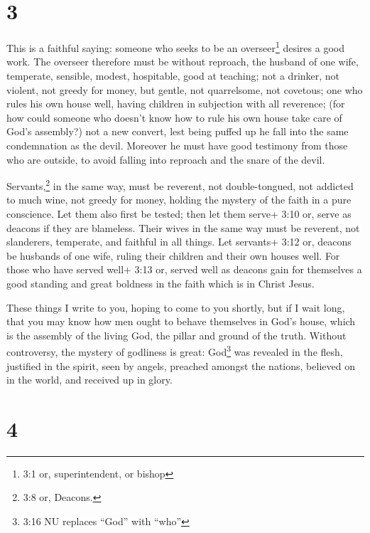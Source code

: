 \hypertarget{section-2}{%
\section{3}\label{section-2}}

 This is a faithful saying: someone who seeks to be an
overseer\footnote{3:1 or, superintendent, or bishop} desires a good
work.  The overseer therefore must be without reproach, the
husband of one wife, temperate, sensible, modest, hospitable, good at
teaching;  not a drinker, not violent, not greedy for money,
but gentle, not quarrelsome, not covetous;  one who rules
his own house well, having children in subjection with all reverence;
 (for how could someone who doesn't know how to rule his own
house take care of God's assembly?)  not a new convert, lest
being puffed up he fall into the same condemnation as the devil.
 Moreover he must have good testimony from those who are
outside, to avoid falling into reproach and the snare of the devil.

 Servants,\footnote{3:8 or, Deacons.} in the same way, must
be reverent, not double-tongued, not addicted to much wine, not greedy
for money,  holding the mystery of the faith in a pure
conscience.  Let them also first be tested; then let them
serve+ 3:10 or, serve as deacons if they are blameless. 
Their wives in the same way must be reverent, not slanderers, temperate,
and faithful in all things.  Let servants+ 3:12 or, deacons
be husbands of one wife, ruling their children and their own houses
well.  For those who have served well+ 3:13 or, served well
as deacons gain for themselves a good standing and great boldness in the
faith which is in Christ Jesus.

 These things I write to you, hoping to come to you
shortly,  but if I wait long, that you may know how men
ought to behave themselves in God's house, which is the assembly of the
living God, the pillar and ground of the truth.  Without
controversy, the mystery of godliness is great: God\footnote{3:16 NU
  replaces ``God'' with ``who''} was revealed in the flesh, justified in
the spirit, seen by angels, preached amongst the nations, believed on in
the world, and received up in glory.

\hypertarget{section-3}{%
\section{4}\label{section-3}}

